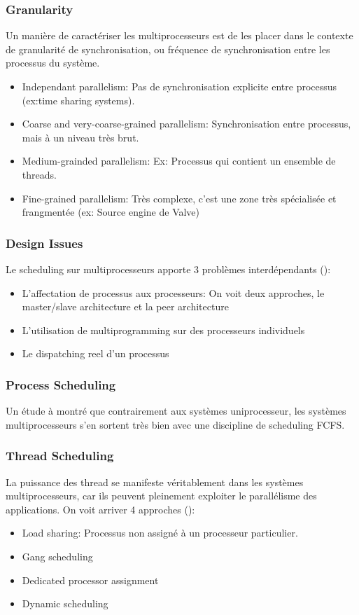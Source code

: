 \subsubsection{Granularity}
Un manière de caractériser les multiprocesseurs est de les placer dans le contexte de granularité de synchronisation, ou fréquence de synchronisation entre les processus du système.
\begin{itemize}
  \item Independant parallelism: Pas de synchronisation explicite entre processus (ex:time sharing systems).
  \item Coarse and very-coarse-grained parallelism: Synchronisation entre processus, mais à un niveau très brut.
  \item Medium-grainded parallelism: Ex: Processus qui contient un ensemble de threads.
  \item Fine-grained parallelism: Très complexe, c'est une zone très spécialisée et frangmentée (ex: Source engine de Valve)
\end{itemize}

\subsubsection{Design Issues}
Le scheduling sur multiprocesseurs apporte 3 problèmes interdépendants (\cite[p.~434-435]{stallings}):
\begin{itemize}
  \item L'affectation de processus aux processeurs: On voit deux approches, le master/slave architecture et la peer architecture
  \item L'utilisation de multiprogramming sur des processeurs individuels
  \item Le dispatching reel d'un processus
\end{itemize}

\subsubsection{Process Scheduling}
Un étude à montré que contrairement aux systèmes uniprocesseur, les systèmes multiprocesseurs s'en sortent très bien avec une discipline de scheduling FCFS.

\subsubsection{Thread Scheduling}
La puissance des thread se manifeste véritablement dans les systèmes multiprocesseurs, car ils peuvent pleinement exploiter le parallélisme des applications.
On voit arriver 4 approches (\cite[p.~437-442]{stallings}):
\begin{itemize}
  \item Load sharing: Processus non assigné à un processeur particulier.
  \item Gang scheduling
  \item Dedicated processor assignment
  \item Dynamic scheduling
\end{itemize}

